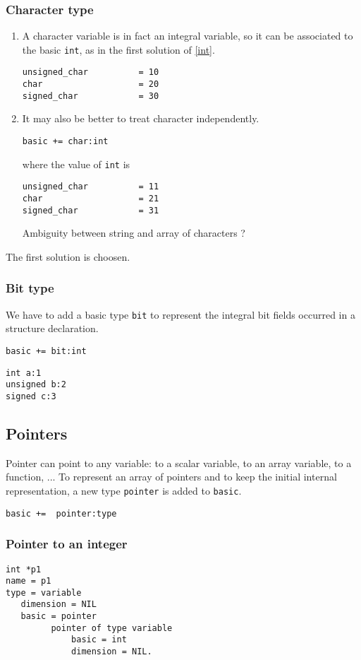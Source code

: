 \documentclass[a4paper]{article}
\begin{document}
\subsubsection{Character type} 
\begin{enumerate}
\item A character variable is in fact an integral variable, so it can be
associated to the basic \verb/int/, as in the first solution of \ref{int}.
\begin{verbatim}
unsigned_char          = 10
char                   = 20
signed_char            = 30
\end{verbatim}
\item 
It may also be better to treat character independently. 

\verb/basic += char:int/

where the value of \verb/int/ is 
\begin{verbatim}
unsigned_char          = 11
char                   = 21
signed_char            = 31
\end{verbatim}
Ambiguity between string and array of characters ?
\end{enumerate}
The first solution is choosen.
\subsubsection{Bit type}
We have to add a basic type \verb/bit/ to represent the integral bit fields
occurred in a structure declaration.   

\verb/basic += bit:int/
\begin{verbatim}
int a:1 
unsigned b:2 
signed c:3
\end{verbatim}
\subsection{Pointers}
Pointer can point to any variable: to a scalar variable, to an array variable, to a function, ...
To represent an array of pointers and to keep the initial internal representation, a new type \verb/pointer/ is
added to \verb/basic/.   

\verb/basic +=  pointer:type/

\subsubsection{Pointer to an integer}
\begin{verbatim}
int *p1
name = p1
type = variable
   dimension = NIL
   basic = pointer
         pointer of type variable
             basic = int
             dimension = NIL.
\end{verbatim}
\end{document}
